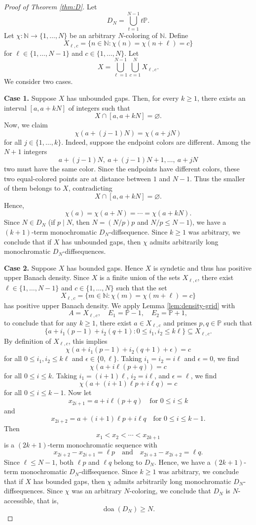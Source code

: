 \documentclass[10pt,a4paper]{amsart}
\begin{document}
\begin{proof}[Proof of Theorem \ref{thm:D}]

Let $$D_N=\bigcup_{t=1}^{N-1}t\mathbb{P}.$$ Let $\chi : \mathbb{N} \to \{1,\dots,N\}$ be an arbitrary $N$-coloring of $\mathbb{N}$. Define $$X_{\ell,c}=\{n \in \mathbb{N} : \chi(n)=\chi(n+\ell)=c\}$$ for $\ell \in \{1,\dots,N-1\}$ and $c \in \{1,\dots,N\}$. Let $$X=\bigcup_{\ell=1}^{N-1}\bigcup_{c=1}^{N}X_{\ell,c}.$$ We consider two cases.

\medskip 
\noindent \textbf{Case 1.} Suppose $X$ has unbounded gaps. Then, for every $k \geq 1$, there exists an interval $[a,a+kN]$ of integers such that $$X \cap [a,a+kN]=\varnothing.$$ Now, we claim $$\chi(a+(j-1)N)=\chi(a+jN)$$ for all $j \in \{1,\dots,k\}$. Indeed, suppose the endpoint colors are different. Among the $N+1$ integers $$a+(j-1)N,\ a+(j-1)N+1,\dots,\ a+jN$$ two must have the same color. Since the endpoints have different colors, these two equal-colored points are at distance between $1$ and $N-1$. Thus the smaller of them belongs to $X$, contradicting $$X\cap [a,a+kN]=\varnothing.$$ Hence, $$\chi(a)=\chi(a+N)=\cdots=\chi(a+kN).$$ Since $N \in D_N$ (if $p \mid N$, then $N=(N/p)p$ and $N/p\leq N-1$), we have a $(k+1)$-term monochromatic $D_N$-diffsequence. Since $k \geq 1$ was arbitrary, we conclude that if $X$ has unbounded gaps, then $\chi$ admits arbitrarily long monochromatic $D_{N}$-diffsequences.

\medskip
\noindent \textbf{Case 2.} Suppose $X$ has bounded gaps. Hence $X$ is syndetic and thus has positive upper Banach density. Since $X$ is a finite union of the sets $X_{\ell,c}$, there exist $\ell \in \{1,\dots,N-1\}$ and $c \in \{1,\dots,N\}$ such that the set $$X_{\ell,c}=\{m \in \mathbb{N}:\chi(m)=\chi(m+\ell)=c\}$$ has positive upper Banach density. We apply Lemma \ref{lem:density-grid} with $$A=X_{\ell,c}, \quad E_1=\mathbb{P}-1, \quad E_2=\mathbb{P}+1,$$ to conclude that for any $k \geq 1$, there exist $a \in X_{\ell,c}$ and primes $p,q \in \mathbb{P}$ such that $$\{a+i_1(p-1)+i_2(q+1) : 0 \leq i_1,i_2 \leq k\ell \} \subseteq X_{\ell,c}.$$ By definition of $X_{\ell,c}$, this implies $$\chi\left(a+i_1(p-1)+i_2(q+1)+\epsilon\right)=c
$$ for all $0\leq i_1,i_2\leq k\ell$ and $\epsilon\in\{0,\ell\}$. Taking $i_1=i_2=i \ell$ and $\epsilon=0$, we find $$\chi(a+i\ell(p+q) )=c$$ for all $0 \leq i \leq k$. Taking $i_1=(i+1)\ell$, $i_2=i\ell$, and $\epsilon=\ell$, we find $$\chi(a+(i+1)\ell p+i\ell q)=c$$ for all $0 \leq i \leq k-1$. Now let $$x_{2i+1}=a+i\ell(p+q) \quad \text{for } 0 \leq i \leq k$$ and $$x_{2i+2}=a+(i+1)\ell p + i\ell q \quad \text{for } 0 \leq i \leq k-1.$$ Then $$x_1<x_2<\cdots<x_{2k+1}$$ is a $(2k+1)$-term monochromatic sequence with $$x_{2i+2}-x_{2i+1}=\ell p \quad \text{and} \quad x_{2i+3}-x_{2i+2}=\ell q.$$ Since $\ell\leq N-1$, both $\ell p$ and $\ell q$ belong to $D_N$. Hence, we have a $(2k+1)$-term monochromatic $D_{N}$-diffsequence. Since $k \geq 1$ was arbitrary, we conclude that if $X$ has bounded gaps, then $\chi$ admits arbitrarily long monochromatic $D_{N}$-diffsequences. Since $\chi$ was an arbitrary $N$-coloring, we conclude that $D_{N}$ is $N$-accessible, that is, $$\operatorname{doa}(D_{N}) \geq N.$$


\end{proof}
\end{document}
